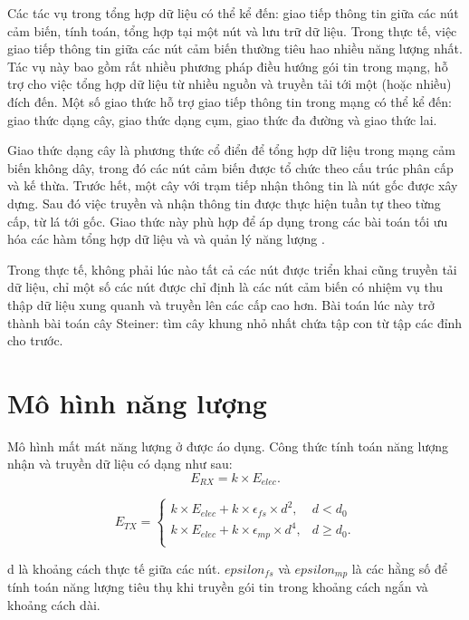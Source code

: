 \documentclass{hust}
\begin{document}
Các tác vụ trong tổng hợp dữ liệu có thể kể đến: giao tiếp thông tin giữa các nút cảm biến, tính toán, tổng hợp tại một nút và lưu trữ dữ liệu. Trong thực tế, việc giao tiếp thông tin giữa các nút cảm biến thường tiêu hao nhiều năng lượng nhất. Tác vụ này bao gồm rất nhiều phương pháp điều hướng gói tin trong mạng, hỗ trợ cho việc tổng hợp dữ liệu từ nhiều nguồn và truyền tải tới một (hoặc nhiều) đích đến. Một số giao thức hỗ trợ giao tiếp thông tin trong mạng có thể kể đến: giao thức dạng cây, giao thức dạng cụm, giao thức đa đường và giao thức lai.


Giao thức dạng cây là phương thức cổ điển để tổng hợp dữ liệu trong mạng cảm biến không dây, trong đó các nút cảm biến được tổ chức theo cấu trúc phân cấp và kế thừa. Trước hết, một cây với trạm tiếp nhận thông tin là nút gốc được xây dựng. Sau đó việc truyền và nhận thông tin được thực hiện tuần tự theo từng cấp, từ lá tới gốc. Giao thức này phù hợp để áp dụng trong các bài toán tối ưu hóa các hàm tổng hợp dữ liệu và và quản lý năng lượng \cite{fasolo2007network}. 


Trong thực tế, không phải lúc nào tất cả các nút được triển khai cũng truyền tải dữ liệu, chỉ một số các nút được chỉ định là các nút cảm biến có nhiệm vụ thu thập dữ liệu xung quanh và truyền lên các cấp cao hơn. Bài toán lúc này trở thành bài toán cây Steiner: tìm cây khung nhỏ nhất chứa tập con từ tập các đỉnh cho trước.


\section{Mô hình năng lượng}
Mô hình mất mát năng lượng ở \cite{heinzelman2002application} được áo dụng. Công thức tính toán năng lượng nhận và truyền dữ liệu có dạng như sau:
\begin{equation}
E_{RX} = k \times E_{elec}.
\end{equation}

\begin{equation}
E_{TX} = 
\begin{cases}
k \times E_{elec} + k \times \epsilon_{fs} \times d^2,  & d < d_0\\
k \times E_{elec} + k \times \epsilon_{mp} \times d^4, & d \geq d_0.\\
\end{cases}
\end{equation}

d là khoảng cách thực tế giữa các nút. $epsilon_{fs}$ và $epsilon_{mp}$ là các hằng số để tính toán năng lượng tiêu thụ khi truyền gói tin trong khoảng cách ngắn và khoảng cách dài.
\end{document}
